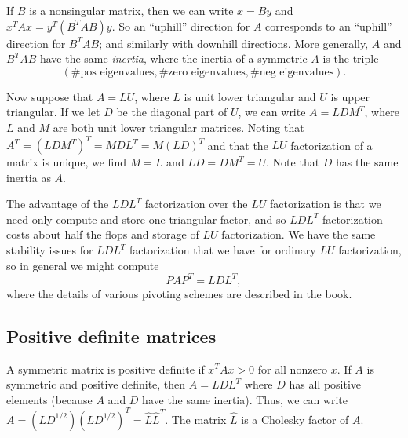 \documentclass[12pt, leqno]{article} %
\begin{document}
If $B$ is a nonsingular matrix, then we can write $x = By$ and $x^T A
x = y^T (B^T A B) y$.  So an ``uphill'' direction for $A$ corresponds
to an ``uphill'' direction for $B^T A B$; and similarly with downhill
directions.  More generally, $A$ and $B^T A B$ have the same {\em inertia},
where the inertia of a symmetric $A$ is the triple
\[
  (\mbox{\# pos eigenvalues},
   \mbox{\# zero eigenvalues},
   \mbox{\# neg eigenvalues}).
\]

Now suppose that $A = LU$, where $L$ is unit lower triangular and $U$
is upper triangular.  If we let $D$ be the diagonal part of $U$, we
can write $A = LDM^T$, where $L$ and $M$ are both unit lower triangular
matrices.  Noting that $A^T = (LDM^T)^T = M D L^T = M (LD)^T$ and
that the $LU$ factorization of a matrix is unique, we find $M = L$
and $LD = DM^T = U$.  Note that $D$ has the same inertia as $A$.

The advantage of the $LDL^T$ factorization over the $LU$ factorization
is that we need only compute and store one triangular factor, and so
$LDL^T$ factorization costs about half the flops and storage of $LU$
factorization.  We have the same stability issues for $LDL^T$
factorization that we have for ordinary $LU$ factorization, so in
general we might compute
\[
  P A P^T = LDL^T,
\]
where the details of various pivoting schemes are described in the book.

\subsection{Positive definite matrices}

A symmetric matrix is positive definite if $x^T A x > 0$ for all
nonzero $x$.  If $A$ is symmetric and positive definite, then $A =
LDL^T$ where $D$ has all positive elements (because $A$ and $D$ have
the same inertia).  Thus, we can write $A = (LD^{1/2})(LD^{1/2})^T =
\hat{L} \hat{L}^T$.  The matrix $\hat{L}$ is a Cholesky factor of $A$.
\end{document}
